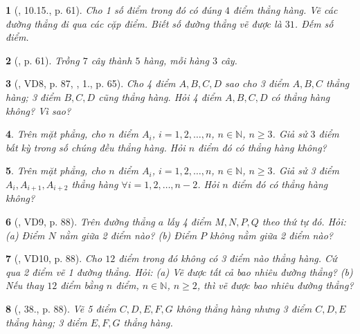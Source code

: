 \documentclass{article}
\newtheorem{baitoan}{}
\begin{document}
\begin{baitoan}[\cite{Binh_boi_duong_Toan_6_tap_2}, 10.15., p. 61]
	Cho 1 số điểm trong đó có đúng $4$ điểm thẳng hàng. Vẽ các đường thẳng đi qua các cặp điểm. Biết số đường thẳng vẽ được là $31$. Đếm số điểm.
\end{baitoan}

\begin{baitoan}[\cite{Binh_boi_duong_Toan_6_tap_2}, p. 61]
	Trồng $7$ cây thành $5$ hàng, mỗi hàng $3$ cây.
\end{baitoan}

\begin{baitoan}[\cite{Tuyen_Toan_6}, VD8, p. 87, \cite{Binh_Toan_6_tap_2}, 1., p. 65]
	Cho 4 điểm $A,B,C,D$ sao cho 3 điểm $A,B,C$ thẳng hàng; 3 điểm $B,C,D$ cũng thẳng hàng. Hỏi 4 điểm $A,B,C,D$ có thẳng hàng không? Vì sao?
\end{baitoan}

\begin{baitoan}
	Trên mặt phẳng, cho $n$ điểm $A_i$, $i = 1,2,\ldots,n$, $n\in\mathbb{N}$, $n\ge3$. Giả sử $3$ điểm bất kỳ trong số chúng đều thẳng hàng. Hỏi $n$ điểm đó có thẳng hàng không?
\end{baitoan}

\begin{baitoan}
	Trên mặt phẳng, cho $n$ điểm $A_i$, $i = 1,2,\ldots,n$, $n\in\mathbb{N}$, $n\ge3$. Giả sử 3 điểm $A_i,A_{i+1},A_{i+2}$ thẳng hàng $\forall i = 1,2,\ldots,n-2$. Hỏi $n$ điểm đó có thẳng hàng không?
\end{baitoan}

\begin{baitoan}[\cite{Tuyen_Toan_6}, VD9, p. 88]
	Trên đường thẳng $a$ lấy 4 điểm $M,N,P,Q$ theo thứ tự đó. Hỏi: (a) Điểm $N$ nằm giữa 2 điểm nào? (b) Điểm $P$ không nằm giữa 2 điểm nào?
\end{baitoan}

\begin{baitoan}[\cite{Tuyen_Toan_6}, VD10, p. 88]
	Cho $12$ điểm trong đó không có 3 điểm nào thẳng hàng. Cứ qua 2 điểm vẽ 1 đường thẳng. Hỏi: (a) Vẽ được tất cả bao nhiêu đường thẳng? (b) Nếu thay $12$ điểm bằng $n$ điểm, $n\in\mathbb{N}$, $n\ge2$, thì vẽ được bao nhiêu đường thẳng?
\end{baitoan}

\begin{baitoan}[\cite{Tuyen_Toan_6}, 38., p. 88]
	Vẽ 5 điểm $C,D,E,F,G$ không thẳng hàng nhưng 3 điểm $C,D,E$ thẳng hàng; 3 điểm $E,F,G$ thẳng hàng.
\end{baitoan}
\end{document}
